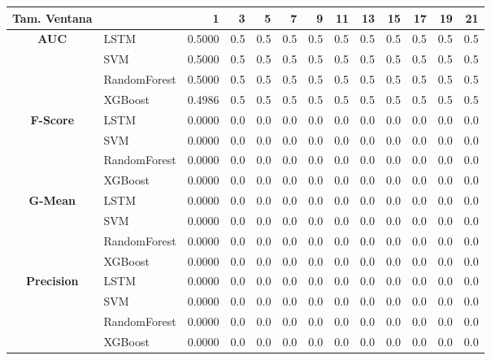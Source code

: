 \begin{table}[h]
	\centering
	\begin{adjustbox}{max width=11cm}
		\begin{tabular}{|c|l|r|r|r|r|r|r|r|r|r|r|r|}
			\hline
			\textbf{Tam. Ventana} &         &      1  &   3  &   5  &   7  &   9  &   11 &   13 &   15 &   17 &   19 &   21 \\
			\hline
			\textbf{AUC} & LSTM &  0.5000 &  0.5 &  0.5 &  0.5 &  0.5 &  0.5 &  0.5 &  0.5 &  0.5 &  0.5 &  0.5 \\
			& SVM &  0.5000 &  0.5 &  0.5 &  0.5 &  0.5 &  0.5 &  0.5 &  0.5 &  0.5 &  0.5 &  0.5 \\
			& RandomForest &  0.5000 &  0.5 &  0.5 &  0.5 &  0.5 &  0.5 &  0.5 &  0.5 &  0.5 &  0.5 &  0.5 \\
			& XGBoost &  0.4986 &  0.5 &  0.5 &  0.5 &  0.5 &  0.5 &  0.5 &  0.5 &  0.5 &  0.5 &  0.5 \\
			\hline
			\textbf{F-Score} & LSTM &  0.0000 &  0.0 &  0.0 &  0.0 &  0.0 &  0.0 &  0.0 &  0.0 &  0.0 &  0.0 &  0.0 \\
			& SVM &  0.0000 &  0.0 &  0.0 &  0.0 &  0.0 &  0.0 &  0.0 &  0.0 &  0.0 &  0.0 &  0.0 \\
			& RandomForest &  0.0000 &  0.0 &  0.0 &  0.0 &  0.0 &  0.0 &  0.0 &  0.0 &  0.0 &  0.0 &  0.0 \\
			& XGBoost &  0.0000 &  0.0 &  0.0 &  0.0 &  0.0 &  0.0 &  0.0 &  0.0 &  0.0 &  0.0 &  0.0 \\
			\hline
			\textbf{G-Mean} & LSTM &  0.0000 &  0.0 &  0.0 &  0.0 &  0.0 &  0.0 &  0.0 &  0.0 &  0.0 &  0.0 &  0.0 \\
			& SVM &  0.0000 &  0.0 &  0.0 &  0.0 &  0.0 &  0.0 &  0.0 &  0.0 &  0.0 &  0.0 &  0.0 \\
			& RandomForest &  0.0000 &  0.0 &  0.0 &  0.0 &  0.0 &  0.0 &  0.0 &  0.0 &  0.0 &  0.0 &  0.0 \\
			& XGBoost &  0.0000 &  0.0 &  0.0 &  0.0 &  0.0 &  0.0 &  0.0 &  0.0 &  0.0 &  0.0 &  0.0 \\
			\hline
			\textbf{Precision} & LSTM &  0.0000 &  0.0 &  0.0 &  0.0 &  0.0 &  0.0 &  0.0 &  0.0 &  0.0 &  0.0 &  0.0 \\
			& SVM &  0.0000 &  0.0 &  0.0 &  0.0 &  0.0 &  0.0 &  0.0 &  0.0 &  0.0 &  0.0 &  0.0 \\
			& RandomForest &  0.0000 &  0.0 &  0.0 &  0.0 &  0.0 &  0.0 &  0.0 &  0.0 &  0.0 &  0.0 &  0.0 \\
			& XGBoost &  0.0000 &  0.0 &  0.0 &  0.0 &  0.0 &  0.0 &  0.0 &  0.0 &  0.0 &  0.0 &  0.0 \\

\end{tabular}
\end{adjustbox}
\end{table}

